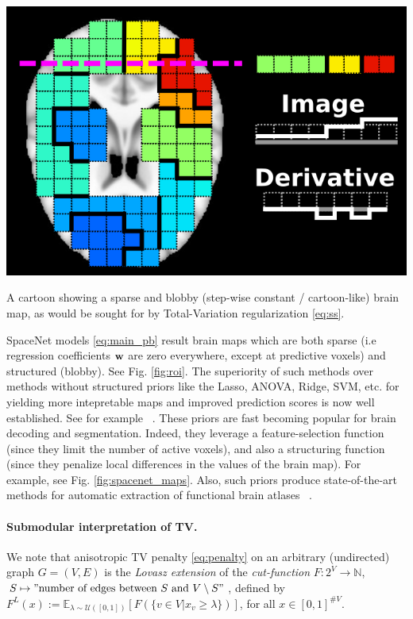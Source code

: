 \begin{marginfigure}
  \includegraphics[width=1\linewidth]{figures/tv_cartoon_horizontal.png}
  \caption{A cartoon showing a sparse and blobby (step-wise constant / cartoon-like) brain map,
  as would be sought for by Total-Variation regularization \eqref{eq:ss}.}
  \label{fig:roi}
\end{marginfigure}

SpaceNet models \eqref{eq:main_pb} result brain maps which are both
sparse (i.e regression coefficients $\mathbf{w}$ are zero everywhere, except at
predictive voxels) and structured (blobby). See Fig. \ref{fig:roi}. The superiority of such
methods over methods without structured priors like the Lasso, ANOVA,
Ridge, SVM, etc. for yielding more intepretable maps and improved
prediction scores is now well established. See for example
 ~\citep{baldassarre2012,gramfort2013}. These priors are fast becoming
popular for brain decoding and segmentation. Indeed, they leverage a
feature-selection function
(since they limit the number of active voxels),
and also a structuring function
(since they penalize local
differences in the values of the brain map). For example, see Fig.
\ref{fig:spacenet_maps}.
Also, such priors produce state-of-the-art methods for automatic
extraction of functional brain atlases  ~\citep{abraham2013}.

\begin{shaded}
  \paragraph{Submodular interpretation of TV.} We note that anisotropic TV penalty \eqref{eq:penalty} on
  an arbitrary (undirected) graph $G = (V,E)$ is the \textit{Lovasz extension} of the \textit{cut-function}
  $F : 2^V \rightarrow \mathbb N$, $S \mapsto "\text{number of edges between } S \text{ and }V\setminus S"$,
defined by $F^L(x) := \mathbb E_{\lambda \sim \mathcal U([0,1])}[F(\{v \in V|x_v \ge \lambda\})]$, for all $x \in [0,1]^{\#V}$.
\end{shaded}

